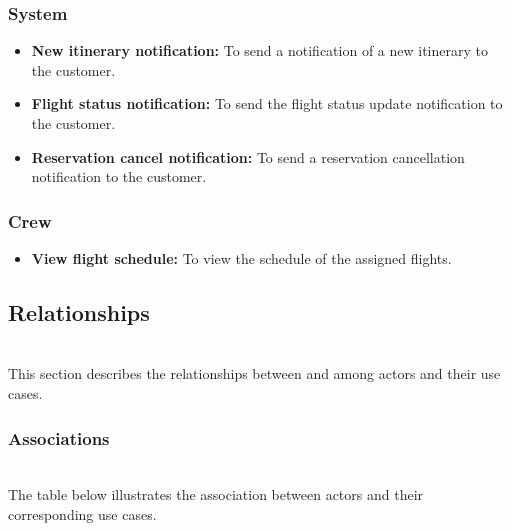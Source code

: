 \subsubsection{System}\label{GeC-rxFoMlj2bMWU-8Heb}

\begin{itemize}
\item
\protect{}\label{BF0-1SL6V03VTrXMJjUXe}
\textbf{New itinerary notification:} To send a notification of a new itinerary to the customer.
\item
\protect{}\label{3oCbE9qDTb9H-s5rgD0h5}
\textbf{Flight status notification:} To send the flight status update notification to the customer.
\item
\protect{}\label{_-iJ8Dif-42G1l_dpeuwc}
\textbf{Reservation cancel notification:} To send a reservation cancellation notification to the customer.
\end{itemize}

\subsubsection{Crew}\label{6WSpF-L_NRv3wlMBRSbd9}

\begin{itemize}
\item
\protect{}\label{uZYm_Arjg4olZdETRbIrW}
\textbf{View flight schedule:} To view the schedule of the assigned flights.
\end{itemize}

\subsection{Relationships}\label{iYkVVKa4DsQkcPPaoMIGM}
\\
This section describes the relationships between and among actors and their use cases.

\subsubsection{Associations}\label{qzrCzXox3txB6bWR3uDSk}
\\
The table below illustrates the association between actors and their corresponding use cases.

